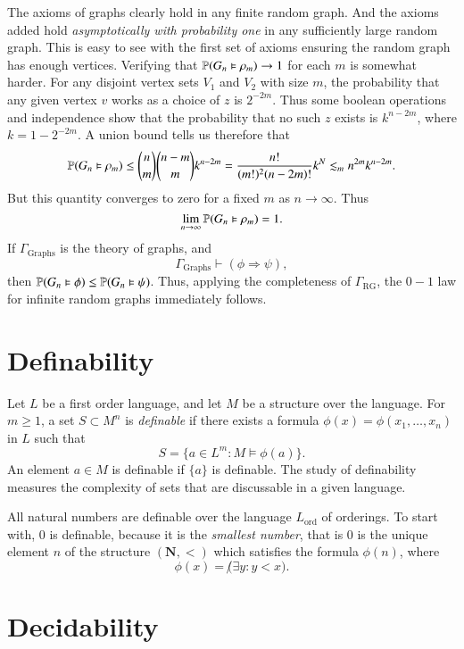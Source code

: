 \begin{example}
    The axioms of graphs clearly hold in any finite random graph. And the axioms added hold \emph{asymptotically with probability one} in any sufficiently large random graph. This is easy to see with the first set of axioms ensuring the random graph has enough vertices. Verifying that $\operatorname{\mathbb{P}}(G_n \vDash \rho_m) \to 1$ for each $m$ is somewhat harder. For any disjoint vertex sets $V_1$ and $V_2$ with size $m$, the probability that any given vertex $v$ works as a choice of $z$ is $2^{-2m}$. Thus some boolean operations and independence show that the probability that no such $z$ exists is $k^{n-2m}$, where $k = 1 - 2^{-2m}$. A union bound tells us therefore that
    \[ \operatorname{\mathbb{P}}(G_n \vDash \rho_m) \leq {n \choose m} {n - m \choose m} k^{n-2m} = \frac{n!}{(m!)^2 (n-2m)!} k^N \lesssim_m n^{2m} k^{n-2m}. \]
    But this quantity converges to zero for a fixed $m$ as $n \to \infty$. Thus
    \[ \lim_{n \to \infty} \operatorname{\mathbb{P}}(G_n \vDash \rho_m) = 1. \]
    If $\Gamma_{\text{Graphs}}$ is the theory of graphs, and
    \[ \Gamma_{\text{Graphs}} \vdash (\phi \Rightarrow \psi), \]
    then $\operatorname{\mathbb{P}}(G_n \vDash \phi) \leq \operatorname{\mathbb{P}}(G_n \vDash \psi)$. Thus, applying the completeness of $\Gamma_{\text{RG}}$, the $0-1$ law for infinite random graphs immediately follows.
\end{example}

\section{Definability}

Let $L$ be a first order language, and let $M$ be a structure over the language. For $m \geq 1$, a set $S \subset M^n$ is \emph{definable} if there exists a formula $\phi(x) = \phi(x_1,\dots,x_n)$ in $L$ such that
%
\[ S = \{ a \in L^m : M \vDash \phi(a) \}. \]
%
An element $a \in M$ is definable if $\{ a \}$ is definable. The study of definability measures the complexity of sets that are discussable in a given language.

\begin{example}
    All natural numbers are definable over the language $L_{\text{ord}}$ of orderings. To start with, $0$ is definable, because it is the \emph{smallest number}, that is $0$ is the unique element $n$ of the structure $(\mathbf{N}, <)$ which satisfies the formula $\phi(n)$, where
    \[ \phi(x) = \not (\exists y: y < x). \]
\end{example}

\section{Decidability}

